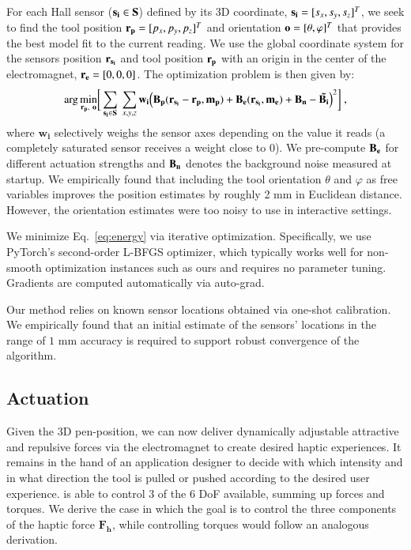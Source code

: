 For each Hall sensor ($\mathbf{s_i} \in \mathbf{S}$) defined by its 3D coordinate, $\mathbf{s_i} = [s_{x},s_{y},s_{z}]^T$, we seek to find the tool position $\mathbf{r_{p}} = [p_x,p_y, p_z]^T$ and orientation $\mathbf{o} = [\theta, \varphi]^T$ that provides the best model fit to the current reading. We use the global coordinate system for the sensors position $\mathbf{r_{s_i}}$ and tool position $\mathbf{r_{p}}$ with an origin in the center of the electromagnet, \ie $\mathbf{r_{e}} = [0,0,0]$. The optimization problem is then given by:
\begin{equation}\label{eq:energy}
\arg\underset{\RpenBold,\ \oBold}{\min} \bigg[ \sum_{\siBold \in \SBold} \ \sum_{x,y,z}
\mathbf{w_i} \Big( \BpBold(\RsiBold - \RpenBold, \mpBold) + \BeBold(\RsiBold, \meBold) + \BnBold - \BiTildeBold \Big)^2 \bigg] \ ,
\end{equation}
where $\mathbf{w_i}$ selectively weighs the sensor axes depending on the value it reads (\ie a completely saturated sensor receives a weight close to 0). We pre-compute $\mathbf{B_e}$ for different actuation strengths and $\mathbf{B_n}$ denotes the background noise measured at startup.
We empirically found that including the tool orientation $\theta$ and $\varphi$ as free variables improves the position estimates by roughly 2 mm in Euclidean distance. However, the orientation estimates were too noisy to use in interactive settings.

We minimize Eq.~\ref{eq:energy} via iterative optimization. Specifically, we use PyTorch's second-order L-BFGS optimizer, which typically works well for non-smooth optimization instances such as ours and requires no parameter tuning. Gradients are computed automatically via auto-grad.

Our method relies on known sensor locations obtained via one-shot calibration. We empirically found that an initial estimate of the sensors' locations in the range of $1$ mm accuracy is required to support robust convergence of the algorithm.

\subsection{Actuation} \label{sc:actuation control}
Given the 3D pen-position, we can now deliver dynamically adjustable attractive and repulsive forces via the electromagnet to create desired haptic experiences. It remains in the hand of an application designer to decide with which intensity and in what direction the tool is pulled or pushed according to the desired user experience. \omniUIST is able to control 3 of the 6 DoF available, summing up forces and torques. We derive the case in which the goal is to control the three components of the haptic force $\mathbf{F_h}$, while controlling torques would follow an analogous derivation.

